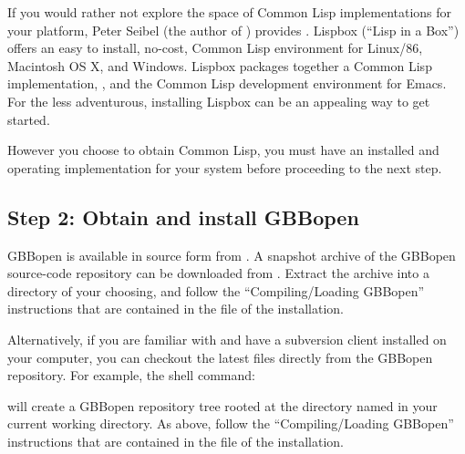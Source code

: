 \documentclass[10pt,twoside,english,pdftex]{article}
\begin{document}
If you would rather not explore the space of Common Lisp implementations for
your platform, Peter Seibel (the author of ) provides
.  Lispbox
(``Lisp in a Box'') offers an easy to install, no-cost, Common Lisp
environment for Linux/86, Macintosh OS X, and Windows.  Lispbox packages
together a Common Lisp implementation,
, and the
 Common Lisp
development environment for Emacs.  For the less adventurous, installing
Lispbox can be an appealing way to get started.

However you choose to obtain Common Lisp, you must have an installed and
operating implementation for your system before proceeding to the next step.

\subsection*{Step 2: Obtain and install GBBopen}

%
%
GBBopen is available in source form from
.  A snapshot archive of
the GBBopen source-code repository can be downloaded from
.
Extract the archive into a directory of your choosing, and follow the
``Compiling/Loading GBBopen'' instructions that are contained in the
 file of the installation.

%
%
Alternatively, if you are familiar with
 and have a subversion
client installed on your computer, you can checkout the latest files directly
from the GBBopen repository.  For example, the shell command:
%
\begin{example}\color{darkergray}%
  [~]$ \textcolor{black}{svn checkout http://GBBopen.org/svn/GBBopen/trunk/ GBBopen}
\end{example}
%
will create a GBBopen repository tree rooted at the directory named
 in your current working directory.  As above, follow the
``Compiling/Loading GBBopen'' instructions that are contained in the
 file of the installation.
\end{document}
